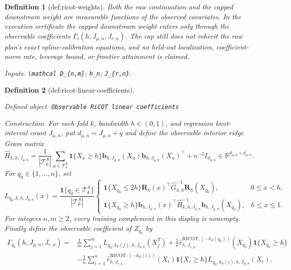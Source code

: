 \documentclass{article}
\newtheorem{definition}{Definition}
\begin{document}
\begin{definition}[def:ricot-weights]
Both the raw continuation and the capped downstream weight are measurable functions of the observed covariates. In the execution certificate the capped downstream weight enters only through the observable coefficients \(\Gamma_i(h,J_{\mu,n},J_{r,n})\). The cap still does not inherit the raw plan's exact spline-calibration equations, and no held-out localization, coefficient-norm rate, leverage bound, or frontier attainment is claimed.
\par\smallskip\noindent\emph{Inputs.} \texttt{\textbackslash{}\allowbreak{}mathcal D\_\allowbreak{}\{n,\allowbreak{}m\}\allowbreak{}}; \texttt{h\_\allowbreak{}n}; \texttt{J\_\allowbreak{}\{r,\allowbreak{}n\}\allowbreak{}}.
\end{definition}

\begin{definition}[def:ricot-linear-coefficients]\label{def:ricot-linear-coefficients}
\par\smallskip\noindent\emph{Defined object.} \texttt{Observable RiCOT linear coefficients}
\par\smallskip\noindent\emph{Construction.} For each fold \(k\), bandwidth \(h\in(0,1)\), and regression knot-interval count \(J_{\mu,n}\), put \(d_{\mu,n}=J_{\mu,n}+q\) and define the observable interior ridge Gram matrix
\[
\widehat H_{k,h,J_{\mu,n}}
=\frac1{|\mathcal T^S_k|}\sum_{u\in\mathcal T^S_k}\mathbf 1\{X_u\ge h\}
\mathbf b_{h,J_{\mu,n}}(X_u)\mathbf b_{h,J_{\mu,n}}(X_u)^\top+n^{-2}I_{d_{\mu,n}}
\in\mathbb R^{d_{\mu,n}\times d_{\mu,n}}.
\]
For \(q_0\in\{1,\ldots,n\}\), set
\[
L_{q_0,k,h,J_{\mu,n}}(x)=\frac{\mathbf 1\{q_0\in\mathcal T^S_k\}}{|\mathcal T^S_k|}
\begin{cases}
\mathbf 1\{X_{q_0}\le2h\}\mathbf R_h(x)^\top\widehat G_{k,h}^{-1}\mathbf R_h(X_{q_0}),&0\le x<h,\\
\mathbf 1\{X_{q_0}\ge h\}\mathbf b_{h,J_{\mu,n}}(x)^\top\widehat H_{k,h,J_{\mu,n}}^{-1}\mathbf b_{h,J_{\mu,n}}(X_{q_0}),&h\le x\le1.
\end{cases}
\]
For integers \(n,m\ge2\), every training complement in this display is nonempty. Finally define the observable coefficient of \(Z_{q_0}\) by
\[
\begin{aligned}
\Gamma_{q_0}(h,J_{\mu,n},J_{r,n})={}&
\frac1m\sum_{j=1}^mL_{q_0,k_T(j),h,J_{\mu,n}}(X_j^T)
+\frac1n\widehat r^{\mathrm{RICOT},(-k_S(q_0))}_{h,J_{r,n}}(X_{q_0})\mathbf 1\{X_{q_0}\ge h\}\\
&-\frac1n\sum_{i=1}^n
\widehat r^{\mathrm{RICOT},(-k_S(i))}_{h,J_{r,n}}(X_i)\mathbf 1\{X_i\ge h\}
L_{q_0,k_S(i),h,J_{\mu,n}}(X_i).

\end{aligned}\]
\end{definition}
\end{document}
